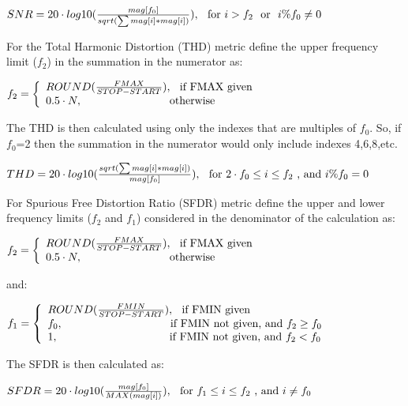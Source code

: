 $SNR = 20 \cdot log10(\frac{mag[f_{0}]}{sqrt(\sum mag[i]*mag[i])}),\hspace*{0.1in}\textrm{for}~i > f_{2} ~\textrm{ or }~i\%f_{0} \ne 0$

For the Total Harmonic Distortion (THD) metric define the upper frequency limit ($f_{2}$) in
the summation in the numerator as:

$f_{2}=\left\{\begin{array}{ll}ROUND(\frac{FMAX}{STOP-START}),\hspace*{0.1in}\textrm{if FMAX given} \\ 0.5 \cdot N,\hspace*{1.1in}\textrm{otherwise}\end{array}\right.$

The THD is then calculated using only the indexes that are multiples of $f_{0}$.  So, if $f_{0}$=2
then the summation in the numerator would only include indexes 4,6,8,etc.

$THD = 20 \cdot log10(\frac{sqrt(\sum mag[i]*mag[i])}{mag[f_{0}]}),\hspace*{0.1in}\textrm{for}~2 \cdot f_{0} \leq i \leq f_{2} ~\textrm{, and}~i\%f_{0}=0$

For Spurious Free Distortion Ratio (SFDR) metric define the upper and lower frequency
limits ($f_{2}$ and $f_{1}$) considered in the denominator of the calculation as:

$f_{2}=\left\{\begin{array}{ll}ROUND(\frac{FMAX}{STOP-START}),\hspace*{0.1in}\textrm{if FMAX given} \\
 0.5 \cdot N,\hspace*{1.1in}\textrm{otherwise}\end{array}\right.$

and:

$f_{1}=\left\{\begin{array}{ll}ROUND(\frac{FMIN}{STOP-START}),\hspace*{0.1in}\textrm{if FMIN given} \\
 f_{0},\hspace*{1.35in}\textrm{if FMIN not given, and}~f_{2} \geq f_{0}\\
 1,\hspace*{1.4in}\textrm{if FMIN not given, and}~f_{2} < f_{0}\end{array}\right.$

The SFDR is then calculated as:

$SFDR = 20 \cdot log10(\frac{mag[f_{0}]}{MAX(mag[i])}), \hspace*{0.1in}\textrm{for}~f_{1} \leq i \leq f_{2}~\textrm{, and}~i \neq f_{0}$

